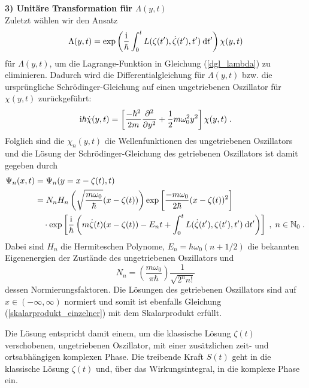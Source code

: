       \textbf{3) Unitäre Transformation für $\Lambda(y,t)$}\\
      Zuletzt wählen wir den Ansatz
      \begin{equation}
        \Lambda(y,t) = \exp\left(\frac{\text i}{\hbar}\int_0^tL(\zeta(t'),\dot \zeta(t'), t') \: \text d t'\right)\chi(y,t)
      \end{equation}
      für $\Lambda(y,t)$, um die Lagrange-Funktion in Gleichung (\ref{dgl_lambda}) zu eliminieren.
      Dadurch wird die Differentialgleichung für $\Lambda(y,t)$ bzw. die ursprüngliche Schrödinger-Gleichung auf einen ungetriebenen Oszillator für $\chi(y,t)$ zurückgeführt:
      \begin{equation}
        \text i \hbar \dot \chi(y,t) = \left[ \frac{-\hbar^2}{2m}\frac{\partial^2}{\partial y^2} + \frac{1}{2}m\omega_0^2y^2 \right]\chi(y,t) \; .
      \end{equation}
      Folglich sind die $\chi_n(y,t)$ die Wellenfunktionen des ungetriebenen Oszillators und die Lösung der Schrödinger-Gleichung des getriebenen Oszillators ist damit gegeben durch
      \begin{align}
        \Psi_n(x,t) &= \Psi_n(y=x-\zeta(t),t) \notag\\
        &= N_nH_n\left(\sqrt{\frac{m\omega_0}{\hbar}}(x-\zeta(t))\right) \exp\left[\frac{-m\omega_0}{2\hbar}(x-\zeta(t))^2\right] \notag\\
        &\quad \cdot \exp\left[\frac{\text i}{\hbar}\left(m\dot \zeta(t)(x-\zeta(t))-E_nt+\int_0^tL(\dot \zeta(t'),\zeta(t'),t')\:\text dt'\right)\right] \; ,
        \; n \in \mathbb{N}_0 \; .
        \label{gesamtlsg_einzelner}
      \end{align}
      Dabei sind $H_n$ die Hermiteschen Polynome, $E_n = \hbar \omega_0(n+1/2)$ die bekannten Eigenenergien der Zustände des ungetriebenen Oszillators und
      \begin{equation}
        N_n = \left(\frac{m\omega_0}{\pi \hbar}\right) \frac{1}{\sqrt{2^nn!}}
      \end{equation}
      dessen Normierungsfaktoren.
      Die Lösungen des getriebenen Oszillators sind auf $x \in (-\infty, \infty)$ normiert und somit ist ebenfalls Gleichung (\ref{skalarprodukt_einzelner}) mit dem Skalarprodukt erfüllt.

      Die Lösung entspricht damit einem, um die klassische Lösung $\zeta(t)$ verschobenen, ungetriebenen Oszillator, mit einer zusätzlichen zeit- und ortsabhängigen komplexen Phase.
      Die treibende Kraft $S(t)$ geht in die klassische Lösung $\zeta(t)$ und, über das Wirkungsintegral, in die komplexe Phase ein.



